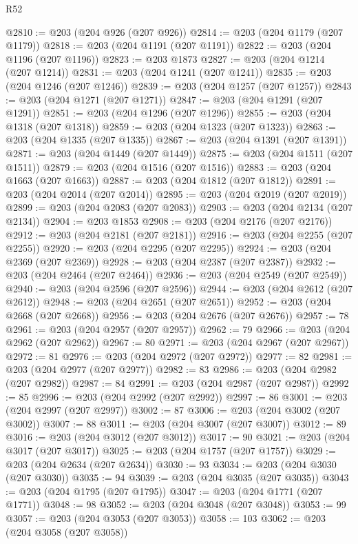 \begin{lexlean}{R52}
\begin{coremodule}
@2810 := @203 (@204 @926 (@207 @926))
@2814 := @203 (@204 @1179 (@207 @1179))
@2818 := @203 (@204 @1191 (@207 @1191))
@2822 := @203 (@204 @1196 (@207 @1196))
@2823 := @203 @1873
@2827 := @203 (@204 @1214 (@207 @1214))
@2831 := @203 (@204 @1241 (@207 @1241))
@2835 := @203 (@204 @1246 (@207 @1246))
@2839 := @203 (@204 @1257 (@207 @1257))
@2843 := @203 (@204 @1271 (@207 @1271))
@2847 := @203 (@204 @1291 (@207 @1291))
@2851 := @203 (@204 @1296 (@207 @1296))
@2855 := @203 (@204 @1318 (@207 @1318))
@2859 := @203 (@204 @1323 (@207 @1323))
@2863 := @203 (@204 @1335 (@207 @1335))
@2867 := @203 (@204 @1391 (@207 @1391))
@2871 := @203 (@204 @1449 (@207 @1449))
@2875 := @203 (@204 @1511 (@207 @1511))
@2879 := @203 (@204 @1516 (@207 @1516))
@2883 := @203 (@204 @1663 (@207 @1663))
@2887 := @203 (@204 @1812 (@207 @1812))
@2891 := @203 (@204 @2014 (@207 @2014))
@2895 := @203 (@204 @2019 (@207 @2019))
@2899 := @203 (@204 @2083 (@207 @2083))
@2903 := @203 (@204 @2134 (@207 @2134))
@2904 := @203 @1853
@2908 := @203 (@204 @2176 (@207 @2176))
@2912 := @203 (@204 @2181 (@207 @2181))
@2916 := @203 (@204 @2255 (@207 @2255))
@2920 := @203 (@204 @2295 (@207 @2295))
@2924 := @203 (@204 @2369 (@207 @2369))
@2928 := @203 (@204 @2387 (@207 @2387))
@2932 := @203 (@204 @2464 (@207 @2464))
@2936 := @203 (@204 @2549 (@207 @2549))
@2940 := @203 (@204 @2596 (@207 @2596))
@2944 := @203 (@204 @2612 (@207 @2612))
@2948 := @203 (@204 @2651 (@207 @2651))
@2952 := @203 (@204 @2668 (@207 @2668))
@2956 := @203 (@204 @2676 (@207 @2676))
@2957 := 78
@2961 := @203 (@204 @2957 (@207 @2957))
@2962 := 79
@2966 := @203 (@204 @2962 (@207 @2962))
@2967 := 80
@2971 := @203 (@204 @2967 (@207 @2967))
@2972 := 81
@2976 := @203 (@204 @2972 (@207 @2972))
@2977 := 82
@2981 := @203 (@204 @2977 (@207 @2977))
@2982 := 83
@2986 := @203 (@204 @2982 (@207 @2982))
@2987 := 84
@2991 := @203 (@204 @2987 (@207 @2987))
@2992 := 85
@2996 := @203 (@204 @2992 (@207 @2992))
@2997 := 86
@3001 := @203 (@204 @2997 (@207 @2997))
@3002 := 87
@3006 := @203 (@204 @3002 (@207 @3002))
@3007 := 88
@3011 := @203 (@204 @3007 (@207 @3007))
@3012 := 89
@3016 := @203 (@204 @3012 (@207 @3012))
@3017 := 90
@3021 := @203 (@204 @3017 (@207 @3017))
@3025 := @203 (@204 @1757 (@207 @1757))
@3029 := @203 (@204 @2634 (@207 @2634))
@3030 := 93
@3034 := @203 (@204 @3030 (@207 @3030))
@3035 := 94
@3039 := @203 (@204 @3035 (@207 @3035))
@3043 := @203 (@204 @1795 (@207 @1795))
@3047 := @203 (@204 @1771 (@207 @1771))
@3048 := 98
@3052 := @203 (@204 @3048 (@207 @3048))
@3053 := 99
@3057 := @203 (@204 @3053 (@207 @3053))
@3058 := 103
@3062 := @203 (@204 @3058 (@207 @3058))

\end{coremodule}
\end{lexlean}
